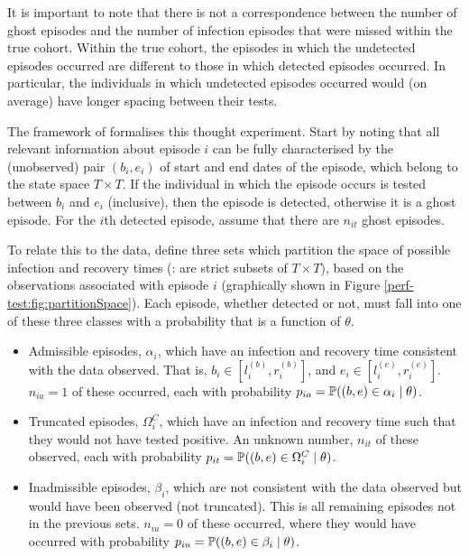 \documentclass[thesis.tex]{subfiles}
\begin{document}
It is important to note that there is not a correspondence between the number of ghost episodes and the number of infection episodes that were missed within the true cohort.
Within the true cohort, the episodes in which the undetected episodes occurred are different to those in which detected episodes occurred.
In particular, the individuals in which undetected episodes occurred would (on average) have longer spacing between their tests.

The framework of \textcite{heiseyModelling} formalises this thought experiment.
Start by noting that all relevant information about episode $i$ can be fully characterised by the (unobserved) pair $(b_i, e_i)$ of start and end dates of the episode, which belong to the state space $T \times T$.
If the individual in which the episode occurs is tested between $b_i$ and $e_i$ (inclusive), then the episode is detected, otherwise it is a ghost episode.
For the $i$th detected episode, assume that there are $n_{it}$ ghost episodes.

To relate this to the data, define three sets which partition the space of possible infection and recovery times (\ie: are strict subsets of $T \times T$), based on the observations associated with episode $i$ (graphically shown in Figure \ref{perf-test:fig:partitionSpace}).
Each episode, whether detected or not, must fall into one of these three classes with a probability that is a function of $\theta$.

\begin{itemize}
\item
  Admissible episodes, $\alpha_i$, which have an infection and
  recovery time consistent with the data observed. That is, $b_i \in [l_i^{(b)}, r_i^{(b)}]$, and $e_i \in [l_i^{(e)}, r_i^{(e)}]$.
  $n_{ia} =1$ of these occurred, each with probability
  $p_{ia} = \operatorname{\mathbb{P}}((b, e) \in \alpha_i \mid \theta)$.
\item
  Truncated episodes, $\Omega_i^C$, which have an infection and
  recovery time such that they would not have tested positive. An
  unknown number, $n_{it}$ of these observed, each with probability
  $p_{it} = \operatorname{\mathbb{P}}((b, e) \in \Omega^C_i \mid \theta)$.
\item
  Inadmissible episodes, $\beta_i$, which are not consistent with the data observed but would have been
  observed (not truncated). This is all remaining episodes not in the
  previous sets. $n_{iu} = 0$ of these occurred, where they would have
  occurred with probability
  $p_{iu} = \operatorname{\mathbb{P}}((b, e) \in \beta_i \mid \theta)$.
\end{itemize}
\end{document}
